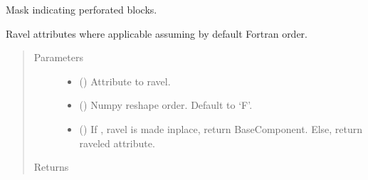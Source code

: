 \documentclass[letterpaper,10pt,english]{sphinxmanual}
\begin{document}
\begin{fulllineitems}

\begin{fulllineitems}
\label{\detokenize{api/wells:geology.src.wells.WellSegment.perforated_indices}}
Mask indicating perforated blocks.

\end{fulllineitems}


\begin{fulllineitems}
\label{\detokenize{api/wells:geology.src.wells.WellSegment.ravel}}
Ravel attributes where applicable assuming by default Fortran order.
\begin{quote}\begin{description}
\item[{Parameters}] \leavevmode\begin{itemize}
\item {} 
 (\sphinxstyleliteralemphasis{\sphinxupquote{, }}) \textendash{} Attribute to ravel.

\item {} 
 () \textendash{} Numpy reshape order. Default to ‘F’.

\item {} 
 () \textendash{} If , ravel is made inplace, return BaseComponent.
Else, return raveled attribute.

\end{itemize}

\item[{Returns}] \leavevmode
{}


\end{description}
\end{quote}
\end{fulllineitems}
\end{fulllineitems}
\end{document}
